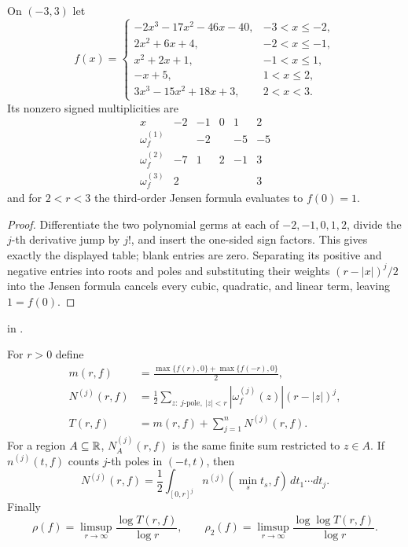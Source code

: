 \begin{example}
\leanok
{}
On $(-3,3)$ let
\[
f(x)=\begin{cases}
-2x^3-17x^2-46x-40,&-3<x\leq-2,\\
2x^2+6x+4,&-2<x\leq-1,\\
x^2+2x+1,&-1<x\leq1,\\
-x+5,&1<x\leq2,\\
3x^3-15x^2+18x+3,&2<x<3.
\end{cases}
\]
Its nonzero signed multiplicities are
\[
\begin{array}{c|rrrrr}
x&-2&-1&0&1&2\\ \hline
\omega_f^{(1)}&&-2&&-5&-5\\
\omega_f^{(2)}&-7&1&2&-1&3\\
\omega_f^{(3)}&2&&&&3
\end{array}
\]
and for $2<r<3$ the third-order Jensen formula evaluates to $f(0)=1$.
\end{example}

\begin{proof}
\leanok
Differentiate the two polynomial germs at each of
$-2,-1,0,1,2$, divide the $j$-th derivative jump by $j!$, and insert the
one-sided sign factors.  This gives exactly the displayed table; blank
entries are zero.  Separating its positive and negative entries into roots
and poles and substituting their weights $(r-|x|)^j/2$ into the Jensen formula
cancels every cubic, quadratic, and linear term, leaving $1=f(0)$.
\end{proof}

\begin{leanproof}
 in
.
\end{leanproof}

\begin{definition}
\leanok
{}
For $r>0$ define
\begin{align*}
 m(r,f)&=\frac{\max\{f(r),0\}+\max\{f(-r),0\}}2,\\
 N^{(j)}(r,f)&=\frac12\sum_{z:\ j\text{-pole},\ |z|<r}
 |\omega_f^{(j)}(z)|(r-|z|)^j,\\
 T(r,f)&=m(r,f)+\sum_{j=1}^nN^{(j)}(r,f).
\end{align*}
For a region $A\subseteq\mathbb R$, $N_A^{(j)}(r,f)$ is the same finite sum
restricted to $z\in A$.  If $n^{(j)}(t,f)$ counts $j$-th poles in $(-t,t)$,
then
\[
 N^{(j)}(r,f)=\frac12\int_{[0,r]^j}
 n^{(j)}\!\left(\min_s t_s,f\right)\,dt_1\cdots dt_j.
\]
Finally
\[
 \rho(f)=\limsup_{r\to\infty}\frac{\log T(r,f)}{\log r},\qquad
 \rho_2(f)=\limsup_{r\to\infty}\frac{\log\log T(r,f)}{\log r}.
\]
\end{definition}

